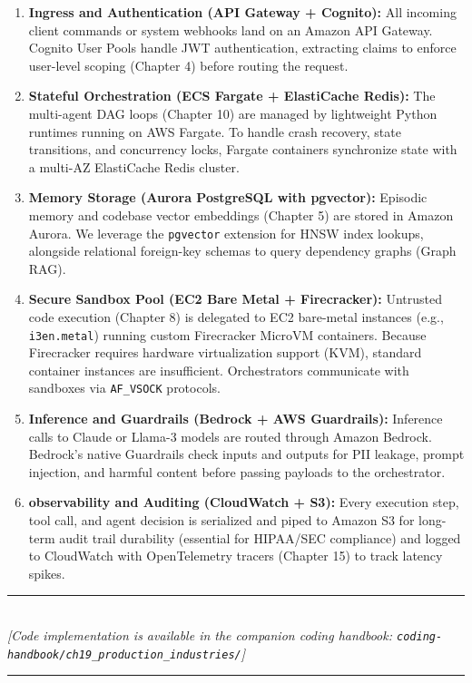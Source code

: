 \begin{enumerate}
    \item \textbf{Ingress and Authentication (API Gateway + Cognito):}
    All incoming client commands or system webhooks land on an Amazon API Gateway. Cognito User Pools handle JWT authentication, extracting claims to enforce user-level scoping (Chapter 4) before routing the request.
    
    \item \textbf{Stateful Orchestration (ECS Fargate + ElastiCache Redis):}
    The multi-agent DAG loops (Chapter 10) are managed by lightweight Python runtimes running on AWS Fargate. To handle crash recovery, state transitions, and concurrency locks, Fargate containers synchronize state with a multi-AZ ElastiCache Redis cluster.
    
    \item \textbf{Memory Storage (Aurora PostgreSQL with pgvector):}
    Episodic memory and codebase vector embeddings (Chapter 5) are stored in Amazon Aurora. We leverage the \texttt{pgvector} extension for HNSW index lookups, alongside relational foreign-key schemas to query dependency graphs (Graph RAG).
    
    \item \textbf{Secure Sandbox Pool (EC2 Bare Metal + Firecracker):}
    Untrusted code execution (Chapter 8) is delegated to EC2 bare-metal instances (e.g., \texttt{i3en.metal}) running custom Firecracker MicroVM containers. Because Firecracker requires hardware virtualization support (KVM), standard container instances are insufficient. Orchestrators communicate with sandboxes via \texttt{AF\_VSOCK} protocols.
    
    \item \textbf{Inference and Guardrails (Bedrock + AWS Guardrails):}
    Inference calls to Claude or Llama-3 models are routed through Amazon Bedrock. Bedrock's native Guardrails check inputs and outputs for PII leakage, prompt injection, and harmful content before passing payloads to the orchestrator.
    
    \item \textbf{observability and Auditing (CloudWatch + S3):}
    Every execution step, tool call, and agent decision is serialized and piped to Amazon S3 for long-term audit trail durability (essential for HIPAA/SEC compliance) and logged to CloudWatch with OpenTelemetry tracers (Chapter 15) to track latency spikes.
\end{enumerate}

\begin{center}
\noindent\rule{0.6\textwidth}{0.4pt} \\
\vspace{0.3em}
\textit{[Code implementation is available in the companion coding handbook: \texttt{coding-handbook/ch19\_production\_industries/}]} \\
\noindent\rule{0.6\textwidth}{0.4pt}
\end{center}

